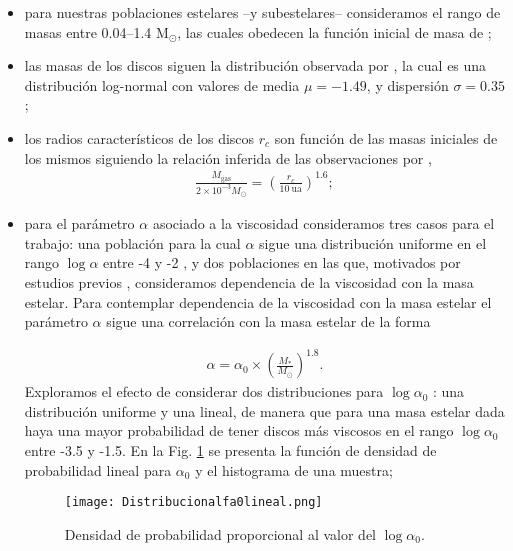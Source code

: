 \documentclass[baaa]{baaa}
\begin{document}
\begin{itemize}

\item para nuestras poblaciones estelares --y subestelares-- consideramos el rango de masas entre 0.04--1.4 $\text{M}_{\odot}$, las cuales obedecen la función inicial de masa de \cite{kroupa2001};

\item las masas de los discos siguen la distribución observada por \cite{tychoniec2018vla}, la cual es una distribución log-normal con valores de media $\mu= -1.49$, y dispersión $\sigma=0.35$ \citep{Emsenhuber_2021}; 

\item los radios característicos de los discos $r_{c}$ son función de las masas iniciales de los mismos siguiendo la relación inferida de las observaciones por \cite{Andrews_2010},
\begin{align}
    \frac{{M}_{\text{gas}}}{2 \times 10^{-3} {M}_{\odot}} = \left( \frac{r_{c}}{10~\text{ua}}\right)^{1.6}; 
    \label{eq:rc_md}
\end{align}

\item para el parámetro $\alpha$ asociado a la viscosidad consideramos tres casos para el trabajo: una población para la cual $\alpha$ sigue una distribución uniforme en el rango $\log \alpha$ entre -4 y -2 \citep[ver el reciente review de][para los valores estimados de $\alpha$ por distintos métodos]{2023Rosotti}, y dos poblaciones en las que, motivados por estudios previos \citep{Gorti_2009}, consideramos dependencia de la viscosidad con la masa estelar. Para contemplar dependencia de la viscosidad con la masa estelar el parámetro $\alpha$ sigue una correlación con la masa estelar de la forma

\begin{align}
    \alpha = \alpha_0 \times  \left(\frac{{M}_{*}}{M_{\odot}}\right)^{1.8}.
    \label{ec:corr}
\end{align}
Exploramos el efecto de considerar dos distribuciones para $\log \alpha_0$ : una distribución uniforme y una lineal, de manera que para una masa estelar dada haya una mayor probabilidad de tener discos más viscosos en el rango $\log \alpha_0$ entre -3.5 y -1.5. En la Fig. \ref{fig:refdistrlineal} se presenta la función de densidad de probabilidad lineal para  $\alpha_{0}$ y el histograma de una muestra;

\begin{figure}
\centering
\texttt{[image: Distribucionalfa0lineal.png]}%
    \caption{Densidad de probabilidad proporcional al valor del $\log \alpha_{0}$.}
    \label{fig:refdistrlineal}
\end{figure}


\end{itemize}
\end{document}
